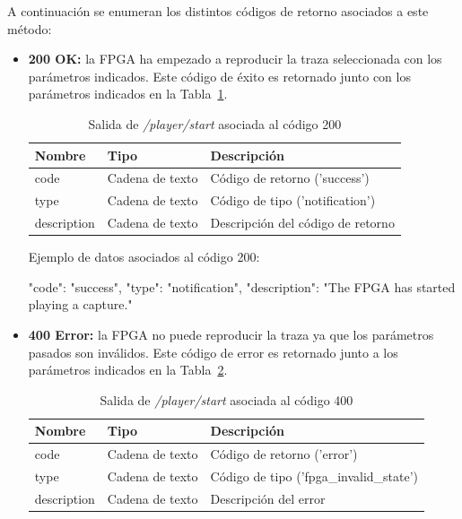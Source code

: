 A continuación se enumeran los distintos códigos de retorno asociados a este método:
\begin{itemize}

\item{\textbf{200 OK:} la \gls{FPGA} ha empezado a reproducir la \gls{traza} seleccionada con los parámetros indicados.
Este código de éxito es retornado junto con los parámetros indicados en la Tabla~\ref{extra:api:playerstart:ok}.
\begin{table}[H]
\centering
\begin{tabular}{|l|l|l|}
\hline
\rowcolor[HTML]{F5F5F5}
\textbf{Nombre}  & \textbf{Tipo}   & \textbf{Descripción}              \\ \hline
code             & Cadena de texto & Código de retorno ('success')     \\ \hline
type             & Cadena de texto & Código de tipo ('notification')   \\ \hline
description      & Cadena de texto & Descripción del código de retorno \\ \hline
\end{tabular}
\caption{Salida de \textit{/player/start} asociada al código 200}
\label{extra:api:playerstart:ok}
\end{table}
\begin{minipage}{\textwidth}
Ejemplo de datos asociados al código 200:

\begin{code}[language=json]
{
  "code": "success",
  "type": "notification",
  "description": "The FPGA has started playing a capture."
}
\end{code}
\end{minipage}
}

\item{\textbf{400 Error:} la \gls{FPGA} no puede reproducir la \gls{traza} ya que los parámetros pasados son inválidos.
Este código de error es retornado junto a los parámetros indicados en la Tabla~\ref{extra:api:playerstart:error400}.
\begin{table}[H]
\centering
\begin{tabular}{|l|l|l|}
\hline
\rowcolor[HTML]{F5F5F5}
\textbf{Nombre}  & \textbf{Tipo}   & \textbf{Descripción}                    \\ \hline
code             & Cadena de texto & Código de retorno ('error')             \\ \hline
type             & Cadena de texto & Código de tipo ('fpga\_invalid\_state') \\ \hline
description      & Cadena de texto & Descripción del error                   \\ \hline
\end{tabular}
\caption{Salida de \textit{/player/start} asociada al código 400}
\label{extra:api:playerstart:error400}
\end{table}

}
\end{itemize}

